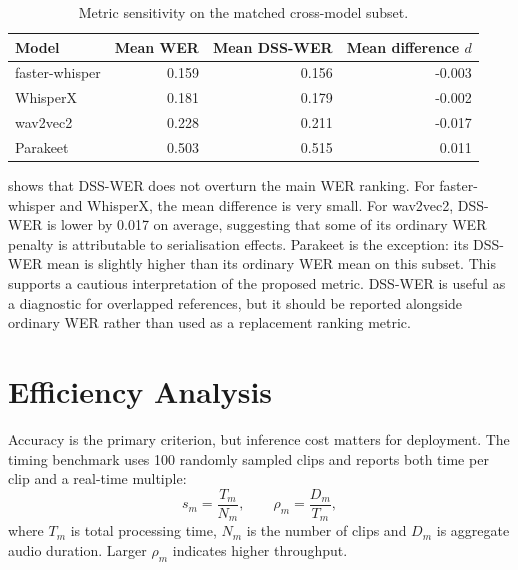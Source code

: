 \begin{table}[htbp]
\centering
\caption{Metric sensitivity on the matched cross-model subset.}
\label{tab:metric_sensitivity}
\begin{tabular}{lrrr}
\toprule
\textbf{Model} & \textbf{Mean WER} & \textbf{Mean DSS-WER} & \textbf{Mean difference \(d\)} \\
\midrule
faster-whisper & 0.159 & 0.156 & -0.003 \\
WhisperX & 0.181 & 0.179 & -0.002 \\
wav2vec2 & 0.228 & 0.211 & -0.017 \\
Parakeet & 0.503 & 0.515 & 0.011 \\
\bottomrule
\end{tabular}
\end{table}

 shows that DSS-WER does not overturn the main WER ranking. For
faster-whisper and WhisperX, the mean difference is very small. For wav2vec2, DSS-WER is lower
by 0.017 on average, suggesting that some of its ordinary WER penalty is attributable to
serialisation effects. Parakeet is the exception: its DSS-WER mean is slightly higher than its
ordinary WER mean on this subset. This supports a cautious interpretation of the proposed
metric. DSS-WER is useful as a diagnostic for overlapped references, but it should be reported
alongside ordinary WER rather than used as a replacement ranking metric.

\section{Efficiency Analysis}
Accuracy is the primary criterion, but inference cost matters for deployment. The timing
benchmark uses 100 randomly sampled clips and reports both time per clip and a real-time
multiple:
\begin{equation}
    s_m = \frac{T_m}{N_m},
    \qquad
    \rho_m = \frac{D_m}{T_m},
\end{equation}
where \(T_m\) is total processing time, \(N_m\) is the number of clips and \(D_m\) is aggregate
audio duration. Larger \(\rho_m\) indicates higher throughput.


